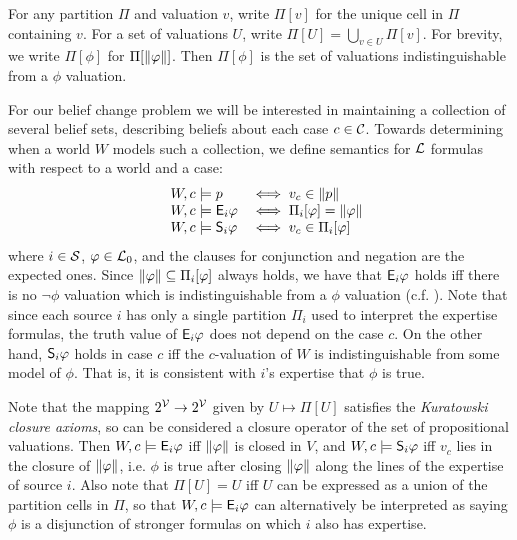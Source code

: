For any partition $\Pi$ and valuation $v$, write $\Pi[v]$ for the unique cell
in $\Pi$ containing $v$. For a set of valuations $U$, write $\Pi[U] =
\bigcup_{v \in U}{\Pi[v]}$. For brevity, we write $\Pi[\phi]$ for
$\Pi[\propmods{\phi}]$. Then $\Pi[\phi]$ is the set of valuations
indistinguishable from a $\phi$ valuation.

For our belief change problem we will be interested in maintaining a
collection of several belief sets, describing beliefs about each case $c \in
\C$. Towards determining when a world $W$ models such a collection, we define
semantics for $\lext$ formulas with respect to a world and a case:
\[
    \begin{array}{lll}
        &W, c \models p &\iff v_c \in \propmods{p} \\
        &W, c \models \E_i\phi &\iff \Pi_i[\phi] = \propmods{\phi} \\
        &W, c \models \S_i\phi &\iff v_c \in \Pi_i[\phi]
    \end{array}
\]
where $i \in \srcs$, $\phi \in \lprop$, and the clauses for conjunction and
negation are the expected ones. Since $\propmods{\phi} \subseteq \Pi_i[\phi]$
always holds, we have that $\E_i\phi$ holds iff there is no
$\neg\phi$ valuation which is indistinguishable from a $\phi$ valuation (c.f.
\textcite{booth_trust_2018}). Note
that since each source $i$ has only a single partition $\Pi_i$ used to
interpret the expertise formulas, the truth value of $\E_i\phi$ does not
depend on the case $c$. On the other hand, $\S_i\phi$ holds in case $c$ iff
the $c$-valuation of $W$ is indistinguishable from some model of $\phi$. That
is, it is consistent with $i$'s expertise that $\phi$ is true.

Note that the mapping $2^\vals \to 2^\vals$ given by $U \mapsto \Pi[U]$
satisfies the \emph{Kuratowski closure axioms},\footnotemark{} so can be
considered a closure operator of the set of propositional valuations. Then $W,
c \models \E_i\phi$ iff $\propmods{\phi}$ is closed in $V$, and $W, c \models
\S_i\phi$ iff $v_c$ lies in the closure of $\propmods{\phi}$, i.e. $\phi$ is
true after closing $\propmods{\phi}$ along the lines of the expertise of source
$i$. Also note that $\Pi[U] = U$ iff $U$ can be expressed as a union of the
partition cells in $\Pi$, so that $W, c \models \E_i\phi$ can alternatively be
interpreted as saying $\phi$ is a disjunction of stronger formulas on which $i$
also has expertise.
%

